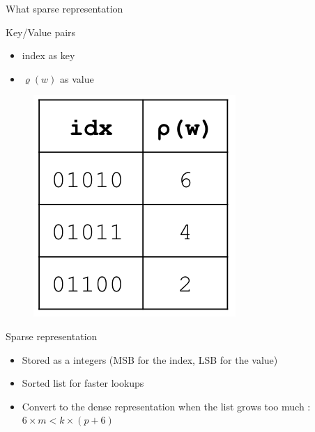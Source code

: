\documentclass{beamer}
\begin{document}
\begin{frame}{What sparse representation}


  \begin{minipage}{0.5\textwidth}%
    \begin{block}{Key/Value pairs}
      \begin{itemize}
        \item index as key
        \item $\varrho(w)$ as value
      \end{itemize}
    \end{block}
  \end{minipage}%
  \hfill%
  \begin{minipage}{0.5\textwidth}%
    \begin{figure}[c]
      \includegraphics [scale=0.5]  {hyperloglog_list.png}
    \end{figure}
  \end{minipage}%


  \begin{block}{Sparse representation}
    \begin{itemize}
      \item Stored as a integers (MSB for the index, LSB for the value)
      \item Sorted list for faster lookups
      \item Convert to the dense representation when the list grows too much : $6\times m < k\times (p + 6)$
    \end{itemize}
  \end{block}

\end{frame}
\end{document}
